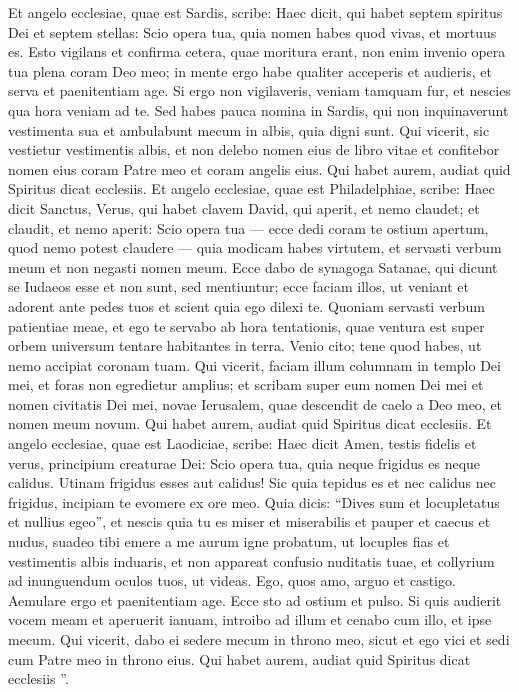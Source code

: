 \begin{biblechapter}
\begin{biblechapter}
\begin{biblechapter}
\verse Et angelo ecclesiae, quae est Sardis, scribe:
 Haec dicit, qui habet septem spiritus Dei et septem stellas: Scio opera tua, quia nomen habes quod vivas, et mortuus es. 
\verse Esto vigilans et confirma cetera, quae moritura erant, non enim invenio opera tua plena coram Deo meo; 
 \verse in mente ergo habe qualiter acceperis et audieris, et serva et paenitentiam age. Si ergo non vigilaveris, veniam tamquam fur, et nescies qua hora veniam ad te. 
\verse Sed habes pauca nomina in Sardis, qui non inquinaverunt vestimenta sua et ambulabunt mecum in albis, quia digni sunt. 
\verse Qui vicerit, sic vestietur vestimentis albis, et non delebo nomen eius de libro vitae et confitebor nomen eius coram Patre meo et coram angelis eius.
 \verse Qui habet aurem, audiat quid Spiritus dicat ecclesiis.
 \verse Et angelo ecclesiae, quae est Philadelphiae, scribe:
 Haec dicit Sanctus, Verus, qui habet clavem David, qui aperit, et nemo claudet; et claudit, et nemo aperit: 
\verse Scio opera tua — ecce dedi coram te ostium apertum, quod nemo potest claudere — quia modicam habes virtutem, et servasti verbum meum et non negasti nomen meum. 
\verse Ecce dabo de synagoga Satanae, qui dicunt se Iudaeos esse et non sunt, sed mentiuntur; ecce faciam illos, ut veniant et adorent ante pedes tuos et scient quia ego dilexi te. 
\verse Quoniam servasti verbum patientiae meae, et ego te servabo ab hora tentationis, quae ventura est super orbem universum tentare habitantes in terra. 
\verse Venio cito; tene quod habes, ut nemo accipiat coronam tuam. 
\verse Qui vicerit, faciam illum columnam in templo Dei mei, et foras non egredietur amplius; et scribam super eum nomen Dei mei et nomen civitatis Dei mei, novae Ierusalem, quae descendit de caelo a Deo meo, et nomen meum novum.
 \verse Qui habet aurem, audiat quid Spiritus dicat ecclesiis.
 \verse Et angelo ecclesiae, quae est Laodiciae, scribe:
 Haec dicit Amen, testis fidelis et verus, principium creaturae Dei: 
\verse Scio opera tua, quia neque frigidus es neque calidus. Utinam frigidus esses aut calidus! 
\verse Sic quia tepidus es et nec calidus nec frigidus, incipiam te evomere ex ore meo. 
\verse Quia dicis: “Dives sum et locupletatus et nullius egeo”, et nescis quia tu es miser et miserabilis et pauper et caecus et nudus, 
 \verse suadeo tibi emere a me aurum igne probatum, ut locuples fias et vestimentis albis induaris, et non appareat confusio nuditatis tuae, et collyrium ad inunguendum oculos tuos, ut videas. 
\verse Ego, quos amo, arguo et castigo. Aemulare ergo et paenitentiam age. 
\verse Ecce sto ad ostium et pulso. Si quis audierit vocem meam et aperuerit ianuam, introibo ad illum et cenabo cum illo, et ipse mecum. 
\verse Qui vicerit, dabo ei sedere mecum in throno meo, sicut et ego vici et sedi cum Patre meo in throno eius.
 \verse Qui habet aurem, audiat quid Spiritus dicat ecclesiis ”.
 

\end{biblechapter}
\end{biblechapter}
\end{biblechapter}
